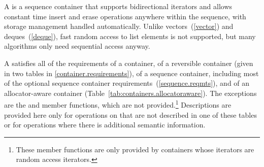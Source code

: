 \pnum
{}%
A
is a sequence container that supports
bidirectional iterators and allows constant time insert and erase
operations anywhere within the sequence, with storage management handled
automatically. Unlike vectors~(\ref{vector}) and deques~(\ref{deque}),
fast random access to list elements is not supported, but many
algorithms only need sequential access anyway.

\pnum
A  satisfies all of the requirements of a container, of
a reversible container (given in two tables in
\ref{container.requirements}), of a sequence container,
including most of the optional sequence container
requirements~(\ref{sequence.reqmts}), and of an allocator-aware container
(Table~\ref{tab:containers.allocatoraware}).
The exceptions are the
and
member functions, which are not provided.\footnote{These member functions
are only provided by containers whose iterators
are random access iterators.
}
Descriptions are provided here only for operations on
that are not described in one of these tables
or for operations where there is additional semantic information.


